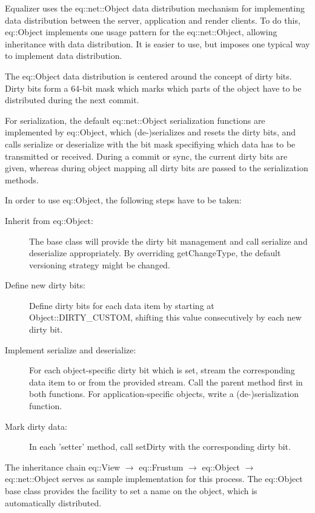 \documentclass[10pt,a4]{scrartcl}
\begin{document}
Equalizer uses the \textsf{eq::net::Object} data distribution mechanism
for implementing data distribution between the server, application and
render clients. To do this, \textsf{eq::Object} implements one usage
pattern for the \textsf{eq::net::Object}, allowing inheritance with data
distribution. It is easier to use, but imposes one typical way to implement data
distribution.

The \textsf{eq::Object} data distribution is centered around the concept
of dirty bits. Dirty bits form a 64-bit mask which marks which parts of
the object have to be distributed during the next commit.

For serialization, the default \textsf{eq::net::Object} serialization
functions are implemented by \textsf{eq::Object}, which (de-)serializes
and resets the dirty bits, and calls \textsf{serialize} or
\textsf{deserialize} with the bit mask specifiying which data has to be
transmitted or received. During a commit or sync, the current dirty bits
are given, whereas during object mapping all dirty bits are passed to
the serialization methods.

In order to use \textsf{eq::Object}, the following steps have to be
taken:

\begin{description}
\item[Inherit from \textsf{eq::Object}:] The base class will provide the
  dirty bit management and call serialize and deserialize
  appropriately. By overriding \textsf{getChangeType}, the default
  versioning strategy might be changed.
\item[Define new dirty bits:] Define dirty bits for each data item by
  starting at \textsf{Object::DIRTY\_CUSTOM}, shifting this value
  consecutively by each new dirty bit.
\item[Implement serialize and deserialize:] For each object-specific
  dirty bit which is set, stream the corresponding data item to or from
  the provided stream. Call the parent method first in both
  functions. For application-specific objects, write a (de-)serialization
  function.
\item[Mark dirty data:] In each 'setter' method, call \textsf{setDirty}
  with the corresponding dirty bit.
\end{description}

The inheritance chain \textsf{eq::View} $\rightarrow$
\textsf{eq::Frustum} $\rightarrow$ \textsf{eq::Object} $\rightarrow$
\textsf{eq::net::Object} serves as sample implementation for this
process. The \textsf{eq::Object} base class provides the facility to set
a name on the object, which is automatically distributed.
\end{document}
